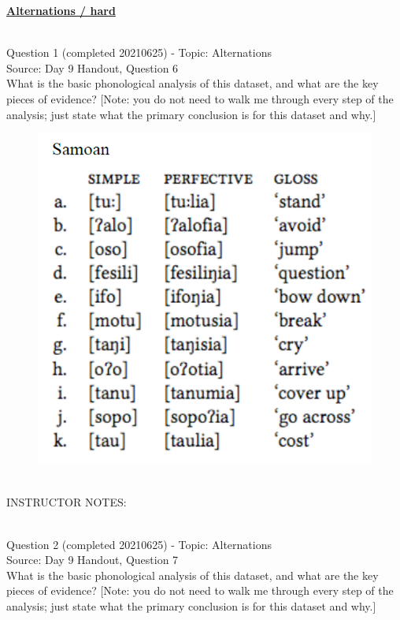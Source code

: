 \documentclass[12pt]{article}
\begin{document}
\newpage\textbf{\underline{\huge Alternations / hard\\}}

~\\

{\large Question 1} (completed 20210625) - Topic: Alternations\\
Source: Day 9 Handout, Question 6\\

What is the basic phonological analysis of this dataset, and what are the key pieces of evidence? [Note: you do not need to walk me through every step of the analysis; just state what the primary conclusion is for this dataset and why.]\\

\begin{figure}[H]
\includegraphics{../images/samoan.png}
\end{figure}

~\\
INSTRUCTOR NOTES: 


~\\

{\large Question 2} (completed 20210625) - Topic: Alternations\\
Source: Day 9 Handout, Question 7\\

What is the basic phonological analysis of this dataset, and what are the key pieces of evidence? [Note: you do not need to walk me through every step of the analysis; just state what the primary conclusion is for this dataset and why.]\\
\end{document}
